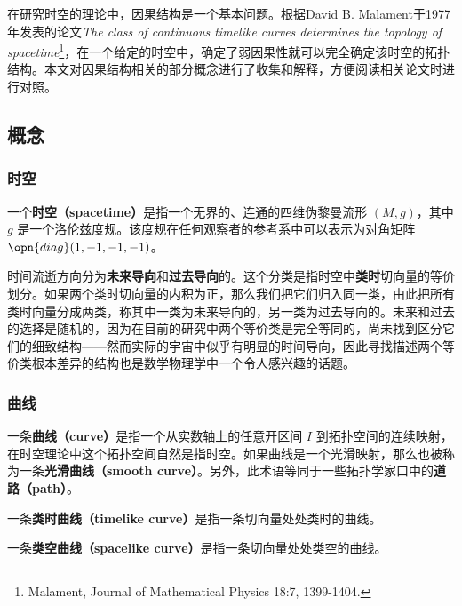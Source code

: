 



在研究时空的理论中，因果结构是一个基本问题。根据David B. Malament于1977年发表的论文\textsl{The class of continuous timelike curves determines the topology of spacetime}\footnote{Malament, Journal of Mathematical Physics 18:7, 1399-1404. }，在一个给定的时空中，确定了弱因果性就可以完全确定该时空的拓扑结构。本文对因果结构相关的部分概念进行了收集和解释，方便阅读相关论文时进行对照。

\subsection{概念}

\subsubsection{时空}

一个\textbf{时空（spacetime）}是指一个无界的、连通的四维伪黎曼流形 $(M, g)$，其中 $g$ 是一个洛伦兹度规。该度规在任何观察者的参考系中可以表示为对角矩阵 $\opn{diag}(1, -1, -1, -1)$。

时间流逝方向分为\textbf{未来导向}和\textbf{过去导向}的。这个分类是指时空中\textbf{类时}切向量的等价划分。如果两个类时切向量的内积为正，那么我们把它们归入同一类，由此把所有类时向量分成两类，称其中一类为未来导向的，另一类为过去导向的。未来和过去的选择是随机的，因为在目前的研究中两个等价类是完全等同的，尚未找到区分它们的细致结构——然而实际的宇宙中似乎有明显的时间导向，因此寻找描述两个等价类根本差异的结构也是数学物理学中一个令人感兴趣的话题。

\subsubsection{曲线}

一条\textbf{曲线（curve）}是指一个从实数轴上的任意开区间 $I$ 到拓扑空间的连续映射，在时空理论中这个拓扑空间自然是指时空。如果曲线是一个光滑映射，那么也被称为一条\textbf{光滑曲线（smooth curve）}。另外，此术语等同于一些拓扑学家口中的\textbf{道路（path）}。

一条\textbf{类时曲线（timelike curve）}是指一条切向量处处类时的曲线。

一条\textbf{类空曲线（spacelike curve）}是指一条切向量处处类空的曲线。

